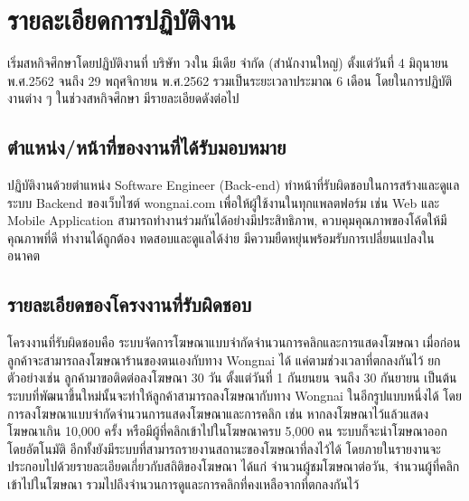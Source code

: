 \chapter{รายละเอียดการปฏิบัติงาน}
\label{chapter:related-theory}

เริ่มสหกิจศึกษาโดยปฏิบัติงานที่ บริษัท วงใน มีเดีย จำกัด (สำนักงานใหญ่) ตั้งแต่วันที่ 4 มิถุนายน พ.ศ.2562 จนถึง 29 พฤศจิกายน พ.ศ.2562 รวมเป็นระยะเวลาประมาณ 6 เดือน โดยในการปฏิบัติงานต่าง ๆ ในช่วงสหกิจศึกษา มีรายละเอียดดังต่อไป

\section{ตำแหน่ง/หน้าที่ของงานที่ได้รับมอบหมาย}
ปฏิบัติงานด้วยตำแหน่ง Software Engineer (Back-end) ทำหน้าที่รับผิดชอบในการสร้างและดูแลระบบ Backend ของเว็บไซต์ wongnai.com เพื่อให้ผู้ใช้งานในทุกแพลตฟอร์ม เช่น Web และ Mobile Application สามารถทำงานร่วมกันได้อย่างมีประสิทธิภาพ, ควบคุมคุณภาพของโค้ดให้มีคุณภาพที่ดี ทำงานได้ถูกต้อง ทดสอบและดูแลได้ง่าย มีความยืดหยุ่นพร้อมรับการเปลี่ยนแปลงในอนาคต

\section{รายละเอียดของโครงงานที่รับผิดชอบ}
โครงงานที่รับผิดชอบคือ ระบบจัดการโฆษณาแบบจำกัดจำนวนการคลิกและการแสดงโฆษณา เมื่อก่อนลูกค้าจะสามารถลงโฆษณาร้านของตนเองกับทาง Wongnai ได้ แค่ตามช่วงเวลาที่ตกลงกันไว้ ยกตัวอย่างเช่น ลูกค้ามาขอติดต่อลงโฆษณา 30 วัน ตั้งแต่วันที่ 1 กันยนยน จนถึง 30 กันยายน เป็นต้น ระบบที่พัฒนาขึ้นใหม่นั้นจะทำให้ลูกค้าสามารถลงโฆษณากับทาง Wongnai ในอีกรูปแบบหนึ่งได้ โดยการลงโฆษณาแบบจำกัดจำนวนการแสดงโฆษณาและการคลิก เช่น หากลงโฆษณาไว้แล้วแสดงโฆษณาเกิน 10,000 ครั้ง หรือมีผู้ที่คลิกเข้าไปในโฆษณาครบ 5,000 คน ระบบก็จะนำโฆษณาออกโดยอัตโนมัติ อีกทั้งยังมีระบบที่สามารถรายงานสถานะของโฆษณาที่ลงไว้ได้ โดยภายในรายงานจะประกอบไปด้วยรายละเอียดเกี่ยวกับสถิติของโฆษณา ได้แก่ จำนวนผู้ชมโฆษณาต่อวัน, จำนวนผู้ที่คลิกเข้าไปในโฆษณา รวมไปถึงจำนวนการดูและการคลิกที่คงเหลือจากที่ตกลงกันไว้

